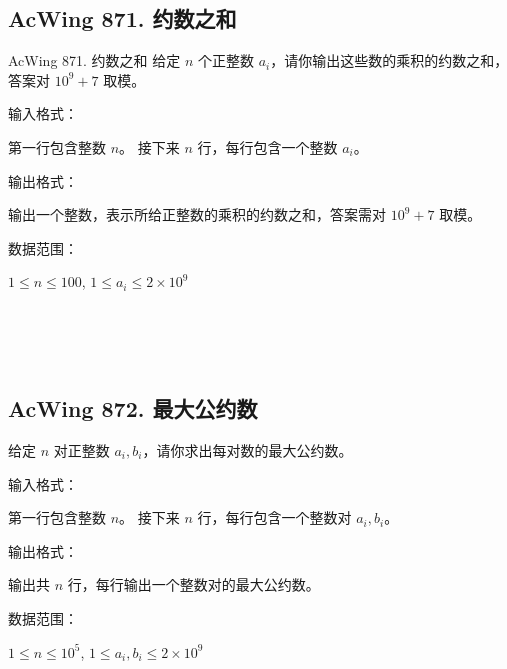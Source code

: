 \subsection{AcWing 871. 约数之和}
\begin{titledbox}{AcWing 871. 约数之和}
    给定 $n$ 个正整数 $a_i$，请你输出这些数的乘积的约数之和，答案对 $10^9+7$ 取模。

    输入格式：

    第一行包含整数 $n$。 接下来 $n$ 行，每行包含一个整数 $a_i$。

    输出格式：

    输出一个整数，表示所给正整数的乘积的约数之和，答案需对 $10^9+7$ 取模。

    数据范围：

    $1 \le n \le 100$, $1 \le a_i \le 2 \times 10^9$

    \begin{inputblock}
         \\
         \\
         \\
    \end{inputblock}
    \begin{outputblock}
    \end{outputblock}
\end{titledbox}

\subsection{AcWing 872. 最大公约数}
\begin{titledbox}
    给定 $n$ 对正整数 $a_i, b_i$，请你求出每对数的最大公约数。

    输入格式：

    第一行包含整数 $n$。 接下来 $n$ 行，每行包含一个整数对 $a_i,b_i$。

    输出格式：

    输出共 $n$ 行，每行输出一个整数对的最大公约数。

    数据范围：

    $1 \le n \le 10^5$, $1 \le a_i, b_i \le 2 \times 10^9$

    \begin{inputblock}
         \\
         \\
    \end{inputblock}
    \begin{outputblock}
         \\
    \end{outputblock}
\end{titledbox}


